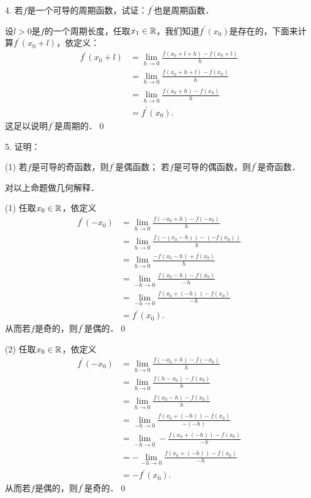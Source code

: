 4. 若$f$是一个可导的周期函数，试证：$f^\prime$也是周期函数．

\prove 设$l > 0$是$f$的一个周期长度，任取$x_1 \in \mathbb{R}$，我们知道$f^{\prime}(x_0)$是存在的，下面来计算$f^{\prime}(x_0 + l)$，依定义：
\begin{align}
    f^{\prime}(x_0 + l) &= \lim_{h \to 0} \frac{f(x_0+l+h)-f(x_0+l)}{h} \\
    &= \lim_{h \to 0} \frac{f(x_0+h + l)-f(x_0)}{h} \\
    &= \lim_{h \to 0} \frac{f(x_0+h)-f(x_0)}{h} \\
    &= f^{\prime}(x_0).
\end{align}
这足以说明$f^{\prime}$是周期的．\qed\bigskip

5. 证明：
\begin{tasks}(1)
    \task 若$f$是可导的奇函数，则$f^\prime$是偶函数；
    \task 若$f$是可导的偶函数，则$f^\prime$是奇函数．
\end{tasks}
对以上命题做几何解释．

(1) \prove 任取$x_0 \in \mathbb{R}$，依定义
\begin{align}
    f^{\prime}(-x_0) &= \lim_{h \to 0} \frac{f(-x_0 + h) - f(-x_0)}{h} \\
    &= \lim_{h \to 0} \frac{f(-(x_0-h))-(-f(x_0))}{h} \\
    &= \lim_{h \to 0} \frac{-f(x_0-h)+f(x_0)}{h} \\
    &= \lim_{-h \to 0} \frac{f(x_0 - h)-f(x_0)}{-h} \\
    &= \lim_{-h \to 0} \frac{f(x_0 + (- h))-f(x_0)}{-h} \\
    &= f^{\prime}(x_0).
\end{align}
从而若$f$是奇的，则$f^{\prime}$是偶的．\qed\bigskip

(2) \prove 任取$x_0 \in \mathbb{R}$，依定义
\begin{align}
    f^{\prime}(-x_0) &= \lim_{h \to 0} \frac{f(-x_0+h)-f(-x_0)}{h} \\
    &= \lim_{h \to 0} \frac{f(h-x_0)-f(x_0)}{h} \\
    &= \lim_{h \to 0} \frac{f(x_0-h)-f(x_0)}{h} \\
    &= \lim_{-h \to 0} \frac{f(x_0+(-h))-f(x_0)}{-(-h)} \\
    &= \lim_{-h \to 0} -\frac{f(x_0+(-h))-f(x_0)}{-h} \\
    &= -\lim_{-h \to 0} \frac{f(x_0+(-h))-f(x_0)}{-h} \\
    &= -f^{\prime}(x_0).
\end{align}
从而若$f$是偶的，则$f^{\prime}$是奇的．\qed\bigskip

